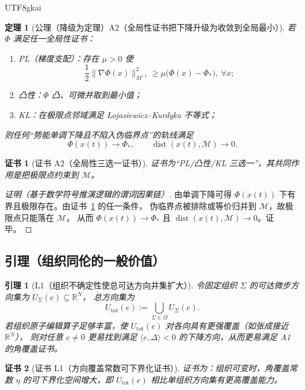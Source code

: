 \documentclass[12pt]{article}
\newtheorem{theorem}{定理}[section]
\newtheorem{lemma}{引理}[section]
\newtheorem{Certificate}{证书}[section]
\newcommand{\RR}{\mathbb{R}}
\begin{document}
\begin{CJK*}{UTF8}{gkai}
\begin{theorem}[公理（降级为定理）A2（全局性证书把下降升级为收敛到全局最小）]
\label{thm:tex28-ch14-a2}
若 $\Phi$ 满足任一全局性证书：
\begin{enumerate}
  \item PL（梯度支配）\cite{polyak1963,karimi2016}：存在 $\mu>0$ 使
  \[
    \frac12\|\nabla\Phi(x)\|_{M^{-1}}^2
    \ge
    \mu\bigl(\Phi(x)-\Phi_*\bigr),\ \forall x;
  \]
  \item 凸性\cite{rockafellar1970}：$\Phi$ 凸、可微并取到最小值；
  \item KL\cite{kurdyka1998,bolte2007}：在极限点邻域满足 \L{}ojasiewicz--Kurdyka 不等式；
\end{enumerate}
则任何“势能单调下降且不陷入伪临界点”的轨线满足
\[
  \Phi(x(t))\to\Phi_*,
  \qquad
  \operatorname{dist}(x(t),\mathcal M)\to 0.
\]
\end{theorem}

\begin{Certificate}[证书 A2（全局性三选一证书）]
\label{cert:tex28-ch14-a2}
证书为“PL/凸性/KL 三选一”，其共同作用是把极限点约束到 $\mathcal M$。
\end{Certificate}

\begin{proof}[证明（基于数学符号推演逻辑的谓词因果链）]
由单调下降可得 $\Phi(x(t))$ 下有界且极限存在。由证书~\ref{cert:tex28-ch14-a2} 的任一条件，
伪临界点被排除或等价归并到 $\mathcal M$，故极限点只能落在 $\mathcal M$，
从而 $\Phi(x(t))\to\Phi_*$ 且 $\operatorname{dist}(x(t),\mathcal M)\to 0$。证毕。
\end{proof}

\subsection{引理（组织同伦的一般价值）}
\label{subsec:tex28-ch14-lemmas}

\begin{lemma}[L1（组织不确定性使总可达方向并集扩大）]
\label{lem:tex28-ch14-l1}
令固定组织 $\Sigma$ 的可达微步方向集为 $U_{\Sigma}(e)\subseteq\RR^N$，
总方向集为
\[
  U_{\mathrm{tot}}(e):=\bigcup_{\Sigma\in\Omega}U_{\Sigma}(e).
\]
若组织原子编辑算子足够丰富，使 $U_{\mathrm{tot}}(e)$ 对各向具有更强覆盖（如张成接近 $\RR^N$），
则对任意 $e\neq 0$ 更易找到满足 $\langle e,\Delta\rangle<0$ 的下降方向，从而更易满足 A1 的角覆盖证书。
\end{lemma}

\begin{Certificate}[证书 L1（方向覆盖常数可下界化证书）]
\label{cert:tex28-ch14-l1}
证书为：组织可变时，角覆盖常数 $\eta$ 的可下界化空间增大，即
$U_{\mathrm{tot}}(e)$ 相比单组织方向集有更高覆盖能力。
\end{Certificate}


\end{CJK*}
\end{document}
